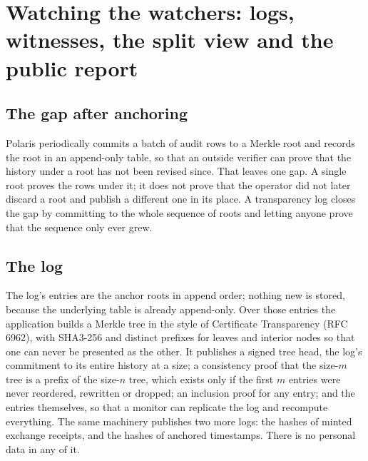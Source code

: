 \section{Watching the watchers: logs, witnesses, the split view and the public report}
\label{sec:transparency}



\subsection{The gap after anchoring}

Polaris periodically commits a batch of audit rows to a Merkle root and records the root in an
append-only table, so that an outside verifier can prove that the history under a root has not been
revised since. That leaves one gap. A single root proves the rows under it; it does not prove that
the operator did not later discard a root and publish a different one in its place. A transparency
log closes the gap by committing to the whole sequence of roots and letting anyone prove that the
sequence only ever grew. \sImpl

\subsection{The log}

The log's entries are the anchor roots in append order; nothing new is stored, because the
underlying table is already append-only. Over those entries the application builds a Merkle tree in
the style of Certificate Transparency (RFC 6962), with SHA3-256 and distinct prefixes for leaves and
interior nodes so that one can never be presented as the other. It publishes a signed tree head,
the log's commitment to its entire history at a size; a consistency proof that the size-$m$ tree is
a prefix of the size-$n$ tree, which exists only if the first $m$ entries were never reordered,
rewritten or dropped; an inclusion proof for any entry; and the entries themselves, so that a
monitor can replicate the log and recompute everything. The same machinery publishes two more logs:
the hashes of minted exchange receipts, and the hashes of anchored timestamps. There is no personal
data in any of it. \sImpl


